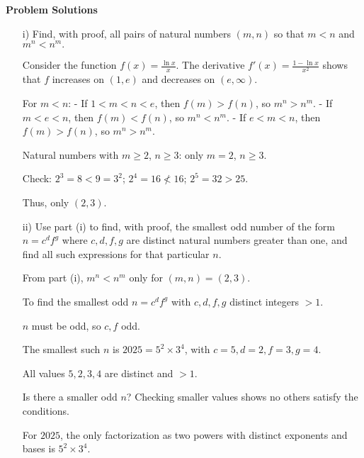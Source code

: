 \documentclass[10pt]{article}
\begin{document}
\textbf{Problem Solutions}

\begin{enumerate}
\item[i)] Find, with proof, all pairs of natural numbers $(m,n)$ so that $m<n$ and $m^n < n^m.$

Consider the function $f(x) = \frac{\ln x}{x}$. The derivative $f'(x) = \frac{1 - \ln x}{x^2}$ shows that $f$ increases on $(1, e)$ and decreases on $(e, \infty)$.

For $m < n$:
- If $1 < m < n < e$, then $f(m) > f(n)$, so $m^n > n^m$.
- If $m < e < n$, then $f(m) < f(n)$, so $m^n < n^m$.
- If $e < m < n$, then $f(m) > f(n)$, so $m^n > n^m$.

Natural numbers with $m \geq 2$, $n \geq 3$: only $m=2$, $n \geq 3$.

Check: $2^3 = 8 < 9 = 3^2$; $2^4 = 16 \not< 16$; $2^5 = 32 > 25$.

Thus, only $(2,3)$.

\item[ii)] Use part (i) to find, with proof, the smallest odd number of the form $n = c^d f^g$ where $c, d, f, g$ are distinct natural numbers greater than one, and find all such expressions for that particular $n$.

From part (i), $m^n < n^m$ only for $(m,n)=(2,3)$.

To find the smallest odd $n = c^d f^g$ with $c,d,f,g$ distinct integers $>1$.

$n$ must be odd, so $c,f$ odd.

The smallest such $n$ is $2025 = 5^2 \times 3^4$, with $c=5, d=2, f=3, g=4$.

All values $5,2,3,4$ are distinct and $>1$.

Is there a smaller odd $n$? Checking smaller values shows no others satisfy the conditions.

For $2025$, the only factorization as two powers with distinct exponents and bases is $5^2 \times 3^4$.

\end{enumerate}
\end{document}
